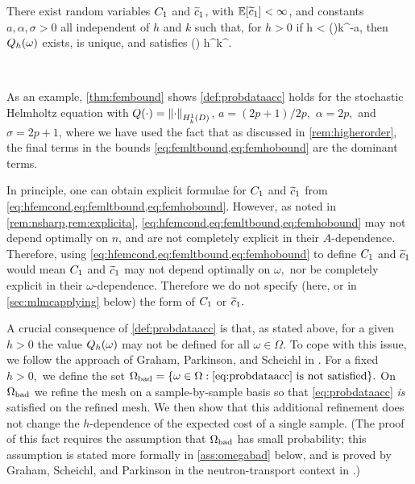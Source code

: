\label{def:probdataacc}
There exist random variables $C_{1}$ and $\widetilde{c}_{1}$, with $\EXP{\cotilde} < \infty$, and constants $a, \alpha, \sigma >0$ all independent of $h$ and $k$ such that, for $h>0$ if
\beq\label{eq:probdataacc}
h < \Co(\omega)k^{-a},
\eeq
then $Q_{h}(\omega)$ exists, is unique, and satisfies
\beq\label{eq:Qhbound}
 \leq \cotilde(\omega) h^\alpha k^\sigma.
\eeq
\eas


\

\bit
\item As an example, \cref{thm:fembound} shows \cref{def:probdataacc} holds for the stochastic Helmholtz equation with $Q(\cdot)=\NHokD{\cdot}$, $a = (2p+1)/2p,$ $\alpha=2p,$ and $\sigma = 2p+1$, where we have used the fact that as discussed in \cref{rem:higherorder}, the final terms in the bounds \cref{eq:femltbound,eq:femhobound} are the dominant terms.
  
\item In principle, one can obtain explicit formulae for $C_{1}$ and $\widetilde{c}_{1}$ from \cref{eq:hfemcond,eq:femltbound,eq:femhobound}. However, as noted in \cref{rem:nsharp,rem:explicita}, \cref{eq:hfemcond,eq:femltbound,eq:femhobound} may not depend optimally on $n$, and are not completely explicit in their $A$-dependence. Therefore, using \cref{eq:hfemcond,eq:femltbound,eq:femhobound} to define $C_{1}$ and $\widetilde{c}_{1}$ would mean $C_{1}$ and $\widetilde{c}_{1}$ may not depend optimally on $\omega,$ nor be completely explicit in their $\omega$-dependence. Therefore we do not specify (here, or in \cref{sec:mlmcapplying} below) the form of $C_{1}$ or $\widetilde{c}_{1}.$


\eit
\ere

A crucial consequence of \cref{def:probdataacc} is that, as stated above, for a given $h>0$ the value $Q_{h}(\omega)$ may not be defined for all $\omega \in \Omega.$ To cope with this issue, we follow the approach of Graham, Parkinson, and Scheichl in \cite{GrPaSc:19}. For a fixed $h>0,$ we define the set $\Omegabad = \set{\omega \in \Omega \st \text{\cref{eq:probdataacc} is not satisfied}}.$ On $\Omega_{\mathrm{bad}}$ we refine the mesh on a sample-by-sample basis so that \cref{eq:probdataacc} \emph{is} satisfied on the refined mesh. We then show that this additional refinement does not change the $h$-dependence of the expected cost of a single sample. (The proof of this fact requires the assumption that $\Omega_{\mathrm{bad}}$ has small probability; this assumption is stated more formally in \cref{ass:omegabad} below, and is proved by Graham, Scheichl, and Parkinson in the neutron-transport context in \cite[Lemma 5.3]{GrPaSc:19}.)

